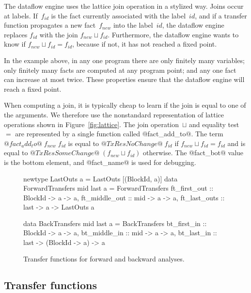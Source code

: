\documentclass[blockstyle,preprint,nocopyrightspace]{sigplanconf}
\newcommand\join{\sqcup}
\newcommand\seclabel[1]{\label{sec:#1}}
\newcommand\figref[1]{Figure~\ref{fig:#1}}
\newcommand\figlabel[1]{\label{fig:#1}}
\begin{document}
The dataflow engine uses the lattice join operation in a stylized way.
Joins occur at labels.
If~$f_{\mathit{id}}$ is the fact currently associated with the
label~$\mathit{id}$, 
and if a transfer function propagates a new fact~$f_{\mathit{new}}$
into the label~$\mathit{id}$, 
the dataflow engine replaces $f_{\mathit{id}}$ with
the join  $f_{\mathit{new}} \join f_{\mathit{id}}$.
Furthermore, the dataflow engine wants to know if
  $f_{\mathit{new}} \join f_{\mathit{id}} = f_{\mathit{id}}$,
because if not, it has not reached a fixed point.

In the example above, in any one program there are only finitely many variables;
only finitely many facts are computed at any program point;
and any one fact can increase at most twice.
These properties
ensure that the dataflow engine will
reach a fixed point.



When computing a join, 
it is typically cheap to learn if the join
is equal to one of the arguments.
We therefore use the nonstandard representation of lattice operations
shown in \figref{lattice}.
The join operation~$\join$ and equality test~$=$ are represented by a
single function called @fact_add_to@.
The term $@fact_add_to@\;f_{\mathit{new}}\;f_{\mathit{id}}$ is equal to
$@TxRes NoChange@\; f_{\mathit{id}}$ if $f_{\mathit{new}} \join f_{\mathit{id}} = f_{\mathit{id}}$
and is equal to
$@TxRes SomeChange@\; (f_{\mathit{new}} \join f_{\mathit{id}})$ otherwise.
The @fact_bot@ value is the bottom element, 
and @fact_name@  is used for debugging.

\begin{figure}
\begin{code}
newtype LastOuts a = LastOuts [(BlockId, a)]
data ForwardTransfers mid last a = ForwardTransfers
 {ft_first_out  :: BlockId -> a -> a,
  ft_middle_out :: mid     -> a -> a,
  ft_last_outs  :: last    -> a -> LastOuts a} 

data BackTransfers mid last a = BackTransfers
 {bt_first_in  :: BlockId -> a              -> a,
  bt_middle_in :: mid     -> a              -> a,
  bt_last_in   :: last    -> (BlockId -> a) -> a} 
\end{code}
\caption{Transfer functions for forward and backward analyses.}
\figlabel{transfers}
%
%
\end{figure}



\subsection{Transfer functions} \seclabel{tffuns}
\end{document}
